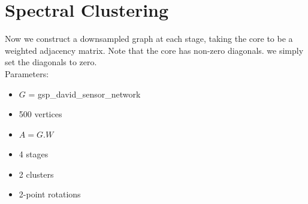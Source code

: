 \documentclass[a4paper]{article}
\begin{document}
\section{Spectral Clustering}
Now we construct a downsampled graph at each stage, taking the core to be a weighted adjacency matrix. Note that the core has non-zero diagonals. we simply set the diagonals to zero. \\
Parameters:
\begin{itemize}
\item $G$ = gsp\_david\_sensor\_network
\item 500 vertices
\item $A = G.W$
\item 4 stages
\item 2 clusters
\item 2-point rotations
\end{itemize}
\end{document}
